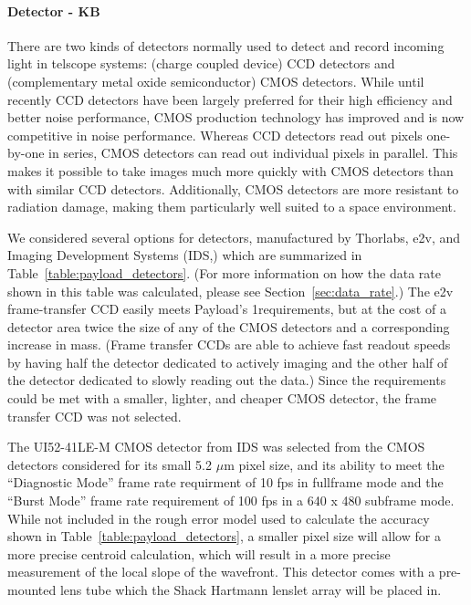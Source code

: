 \documentclass[12pt]{article}
\begin{document}
\paragraph{Detector - KB} \label{par:payload_detector}
There are two kinds of detectors normally used to detect and record incoming light in telscope systems: (charge coupled device) CCD detectors and (complementary metal oxide semiconductor) CMOS detectors. While until recently CCD detectors have been largely preferred for their high efficiency and better noise performance, CMOS production technology has improved and is now competitive in noise performance. Whereas CCD detectors read out pixels one-by-one in series, CMOS detectors can read out individual pixels in parallel. This makes it possible to take images much more quickly with CMOS detectors than with similar CCD detectors. Additionally, CMOS detectors are more resistant to radiation damage, making them particularly well suited to a space environment.

We considered several options for detectors, manufactured by Thorlabs, e2v, and Imaging Development Systems (IDS,) which are summarized in Table~\ref{table:payload_detectors}. (For more information on how the data rate shown in this table was calculated, please see Section~\ref{sec:data_rate}.) The e2v frame-transfer CCD easily meets Payload's 1requirements, but at the cost of a detector area twice the size of any of the CMOS detectors and a corresponding increase in mass. (Frame transfer CCDs are able to achieve fast readout speeds by having half the detector dedicated to actively imaging and the other half of the detector dedicated to slowly reading out the data.) Since the requirements could be met with a smaller, lighter, and cheaper CMOS detector, the frame transfer CCD was not selected. 
 
The UI52-41LE-M CMOS detector from IDS was selected from the CMOS detectors considered for its small 5.2 $\mu \text{m}$ pixel size, and its ability to meet the ``Diagnostic Mode'' frame rate requirment of 10 fps in fullframe mode and the ``Burst Mode'' frame rate requirement of 100 fps in a 640 x 480 subframe mode. While not included in the rough error model used to calculate the accuracy shown in Table~\ref{table:payload_detectors}, a smaller pixel size will allow for a more precise centroid calculation, which will result in a more precise measurement of the local slope of the wavefront. This detector comes with a pre-mounted lens tube which the Shack Hartmann lenslet array will be placed in. 
\end{document}
